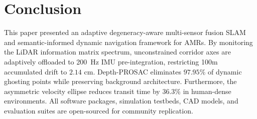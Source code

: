 \documentclass[journal]{IEEEtran}
\begin{document}
\section{Conclusion}
This paper presented an adaptive degeneracy-aware multi-sensor fusion SLAM and semantic-informed dynamic navigation framework for AMRs. By monitoring the LiDAR information matrix spectrum, unconstrained corridor axes are adaptively offloaded to 200~Hz IMU pre-integration, restricting 100m accumulated drift to $2.14\text{ cm}$. Depth-PROSAC eliminates $97.95\%$ of dynamic ghosting points while preserving background architecture. Furthermore, the asymmetric velocity ellipse reduces transit time by $36.3\%$ in human-dense environments. All software packages, simulation testbeds, CAD models, and evaluation suites are open-sourced for community replication.



\end{document}
